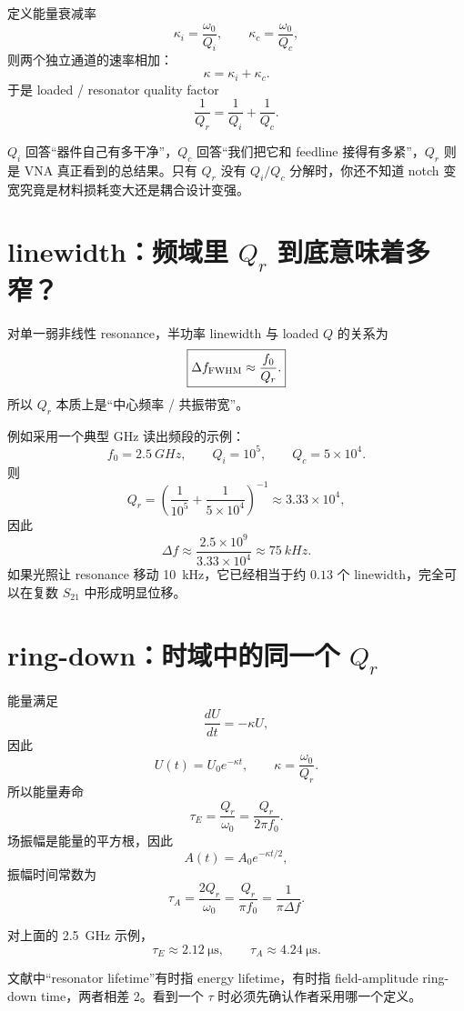 \documentclass[11pt,a4paper,openany]{ctexrep}
\begin{document}
定义能量衰减率
\[
\kappa_i=\frac{\omega_0}{Q_i},
\qquad
\kappa_c=\frac{\omega_0}{Q_c},
\]
则两个独立通道的速率相加：
\[
\kappa=\kappa_i+\kappa_c.
\]
于是 loaded / resonator quality factor
\[
\boxed{
\frac{1}{Q_r}=\frac{1}{Q_i}+\frac{1}{Q_c}.
}
\]

\begin{intuitionbox}
$Q_i$ 回答“器件自己有多干净”，$Q_c$ 回答“我们把它和 feedline 接得有多紧”，$Q_r$ 则是 VNA 真正看到的总结果。只有 $Q_r$ 没有 $Q_i/Q_c$ 分解时，你还不知道 notch 变宽究竟是材料损耗变大还是耦合设计变强。
\end{intuitionbox}

\section{linewidth：频域里 $Q_r$ 到底意味着多窄？}

对单一弱非线性 resonance，半功率 linewidth 与 loaded $Q$ 的关系为
\[
\boxed{
\Delta f_{\rm FWHM}\approx\frac{f_0}{Q_r}.
}
\]
所以 $Q_r$ 本质上是“中心频率 / 共振带宽”。

例如采用一个典型 GHz 读出频段的示例：
\[
f_0=\SI{2.5}{GHz},\qquad Q_i=10^5,\qquad Q_c=5\times10^4.
\]
则
\[
Q_r=\left(\frac1{10^5}+\frac1{5\times10^4}\right)^{-1}
\approx3.33\times10^4,
\]
因此
\[
\boxed{
\Delta f\approx\frac{2.5\times10^9}{3.33\times10^4}
\approx\SI{75}{kHz}.
}
\]
如果光照让 resonance 移动 \SI{10}{kHz}，它已经相当于约 $0.13$ 个 linewidth，完全可以在复数 $S_{21}$ 中形成明显位移。

\section{ring-down：时域中的同一个 $Q_r$}

能量满足
\[
\frac{dU}{dt}=-\kappa U,
\]
因此
\[
U(t)=U_0e^{-\kappa t},
\qquad
\kappa=\frac{\omega_0}{Q_r}.
\]
所以能量寿命
\[
\boxed{
\tau_E=\frac{Q_r}{\omega_0}=\frac{Q_r}{2\pi f_0}.
}
\]
场振幅是能量的平方根，因此
\[
A(t)=A_0e^{-\kappa t/2},
\]
振幅时间常数为
\[
\boxed{
\tau_A=\frac{2Q_r}{\omega_0}=\frac{Q_r}{\pi f_0}
=\frac{1}{\pi\Delta f}.
}
\]

对上面的 \SI{2.5}{GHz} 示例，
\[
\tau_E\approx\SI{2.12}{\micro\second},
\qquad
\tau_A\approx\SI{4.24}{\micro\second}.
\]

\begin{mistakebox}
文献中“resonator lifetime”有时指 energy lifetime，有时指 field-amplitude ring-down time，两者相差 2。看到一个 $\tau$ 时必须先确认作者采用哪一个定义。
\end{mistakebox}
\end{document}
